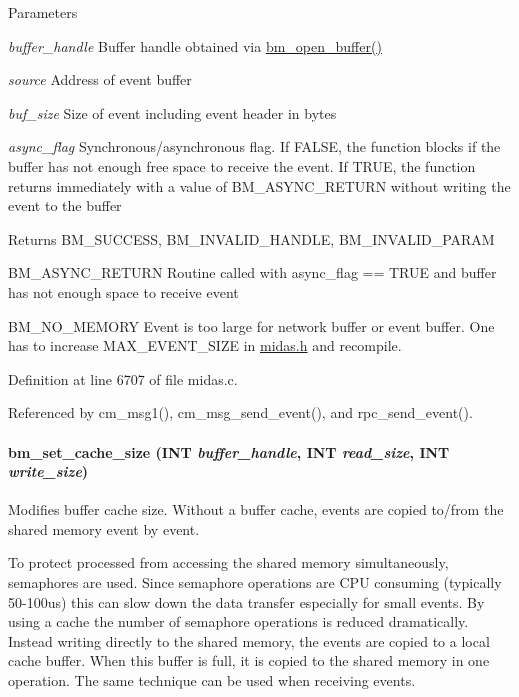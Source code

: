 \begin{DoxyParams}{Parameters}
\item[{\em buffer\_\-handle}]Buffer handle obtained via \hyperlink{group__bmfunctionc_gae9636ff3e34ee94e31cb292bd07a679d}{bm\_\-open\_\-buffer()} \item[{\em source}]Address of event buffer \item[{\em buf\_\-size}]Size of event including event header in bytes \item[{\em async\_\-flag}]Synchronous/asynchronous flag. If FALSE, the function blocks if the buffer has not enough free space to receive the event. If TRUE, the function returns immediately with a value of BM\_\-ASYNC\_\-RETURN without writing the event to the buffer \end{DoxyParams}
\begin{DoxyReturn}{Returns}
BM\_\-SUCCESS, BM\_\-INVALID\_\-HANDLE, BM\_\-INVALID\_\-PARAM\par
 BM\_\-ASYNC\_\-RETURN Routine called with async\_\-flag == TRUE and buffer has not enough space to receive event\par
 BM\_\-NO\_\-MEMORY Event is too large for network buffer or event buffer. One has to increase MAX\_\-EVENT\_\-SIZE in \hyperlink{midas_8h}{midas.h} and recompile. 
\end{DoxyReturn}


Definition at line 6707 of file midas.c.

Referenced by cm\_\-msg1(), cm\_\-msg\_\-send\_\-event(), and rpc\_\-send\_\-event().
\paragraph[{bm\_\-set\_\-cache\_\-size}]{ bm\_\-set\_\-cache\_\-size ({\bf INT} {\em buffer\_\-handle}, \/  {\bf INT} {\em read\_\-size}, \/  {\bf INT} {\em write\_\-size})}\hfill\label{group__bmfunctionc_ga2689ca85c6d0023f1a02e6827a5eff6e}
Modifies buffer cache size. Without a buffer cache, events are copied to/from the shared memory event by event.

To protect processed from accessing the shared memory simultaneously, semaphores are used. Since semaphore operations are CPU consuming (typically 50-\/100us) this can slow down the data transfer especially for small events. By using a cache the number of semaphore operations is reduced dramatically. Instead writing directly to the shared memory, the events are copied to a local cache buffer. When this buffer is full, it is copied to the shared memory in one operation. The same technique can be used when receiving events.

